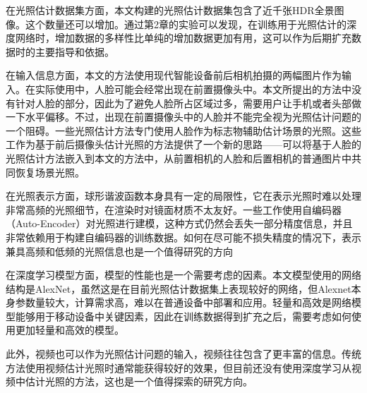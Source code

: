在光照估计数据集方面，本文构建的光照估计数据集包含了近千张HDR全景图像。这个数量还可以增加。通过第2章的实验可以发现，在训练用于光照估计的深度网络时，增加数据的多样性比单纯的增加数据更加有用，这可以作为后期扩充数据时的主要指导和依据。

在输入信息方面，本文的方法使用现代智能设备前后相机拍摄的两幅图片作为输入。在实际使用中，人脸可能会经常出现在前置摄像头中。本文所提出的方法中没有针对人脸的部分，因此为了避免人脸所占区域过多，需要用户让手机或者头部做一下水平偏移。不过，出现在前置摄像头中的人脸并不能完全视为光照估计问题的一个阻碍。一些光照估计方法专门使用人脸作为标志物辅助估计场景的光照。这些工作为基于前后摄像头估计光照的方法提供了一个新的思路——可以将基于人脸的光照估计方法嵌入到本文的方法中，从前置相机的人脸和后置相机的普通图片中共同恢复场景光照。

在光照表示方面，球形谐波函数本身具有一定的局限性，它在表示光照时难以处理非常高频的光照细节，在渲染时对镜面材质不太友好。一些工作使用自编码器（Auto-Encoder）对光照进行建模，这种方式仍然会丢失一部分精度信息，并且非常依赖用于构建自编码器的训练数据。如何在尽可能不损失精度的情况下，表示兼具高频和低频的光照信息也是一个值得研究的方向

在深度学习模型方面，模型的性能也是一个需要考虑的因素。本文模型使用的网络结构是AlexNet，虽然这是在目前光照估计数据集上表现较好的网络，但Alexnet本身参数量较大，计算需求高，难以在普通设备中部署和应用。轻量和高效是网络模型能够用于移动设备中关键因素，因此在训练数据得到扩充之后，需要考虑如何使用更加轻量和高效的模型。

此外，视频也可以作为光照估计问题的输入，视频往往包含了更丰富的信息。传统方法使用视频估计光照时通常能获得较好的效果，但目前还没有使用深度学习从视频中估计光照的方法，这也是一个值得探索的研究方向。